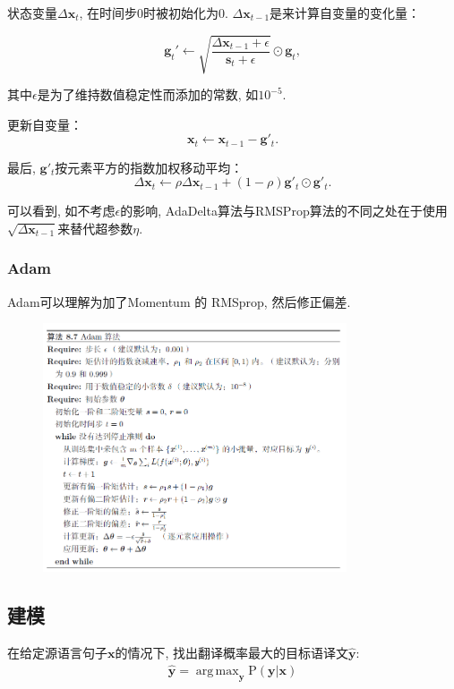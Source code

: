 \documentclass[a4paper]{article}
\theoremstyle{definition}
\numberwithin{equation}{section}
\newcommand{\parinterval}{\noindent\hspace{2em}}%
\DeclareMathOperator*{\argmax}{arg\, max}
\begin{document}
状态变量$\Delta\boldsymbol{x}_t$, 在时间步0时被初始化为0. $\Delta\boldsymbol{x}_{t-1}$是来计算自变量的变化量：

$$ \boldsymbol{g}_t' \leftarrow \sqrt{\frac{\Delta\boldsymbol{x}_{t-1} + \epsilon}{\boldsymbol{s}_t + \epsilon}}   \odot \boldsymbol{g}_t,  $$

其中$\epsilon$是为了维持数值稳定性而添加的常数, 如$10^{-5}$. 

更新自变量：
$$\boldsymbol{x}_t \leftarrow \boldsymbol{x}_{t-1} - \boldsymbol{g}'_t. $$

最后, $\boldsymbol{g}'_t$按元素平方的指数加权移动平均：
$$\Delta\boldsymbol{x}_t \leftarrow \rho \Delta\boldsymbol{x}_{t-1} + (1 - \rho) \boldsymbol{g}'_t \odot \boldsymbol{g}'_t. $$

可以看到, 如不考虑$\epsilon$的影响, AdaDelta算法与RMSProp算法的不同之处在于使用$\sqrt{\Delta\boldsymbol{x}_{t-1}}$来替代超参数$\eta$. 

\subsubsection{Adam} \citep{Kingma2014Adam}
Adam可以理解为加了Momentum 的 RMSprop, 然后修正偏差.
\begin{figure}[htp]
    \centering
     \includegraphics[width=0.8\textwidth]{adam.png}
 
    \label{fig:adm}
    \end{figure}

\subsection{建模}

\parinterval 在给定源语言句子$\mathbf{x}$的情况下, 找出翻译概率最大的目标语译文$\hat{\mathbf{y}}$:
\begin{eqnarray}
\hat{\mathbf{y}} = \argmax_{\mathbf{y}} \textrm{P} (\mathbf{y} | \mathbf{x})
\end{eqnarray}
\end{document}
